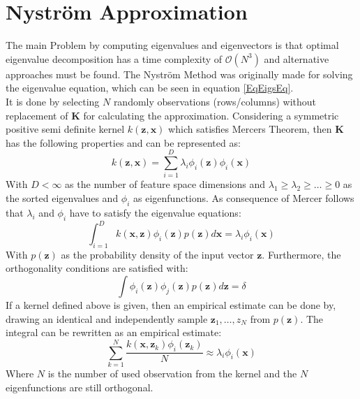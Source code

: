 \section{Nyström Approximation}\label{InSecNysMeth}
The main Problem by computing eigenvalues and eigenvectors is that optimal eigenvalue decomposition has a time complexity of $\mathcal{O}(N^3)$ and alternative approaches must be found.
The Nyström Method was originally made for solving the eigenvalue equation, which can be seen in equation \eqref{EqEigsEq}.\cite{Zhang.2008}\\
It is done by selecting $N$ randomly observations (rows/columns) without replacement of $\mathbf{K}$ for calculating the approximation.\cite{Williams.2000}
Considering a symmetric positive semi definite kernel $k(\mathbf{z},\mathbf{x})$ which satisfies Mercers Theorem, then $\mathbf{K}$ has the following properties and can be represented as:\cite{Williams.2000}
\begin{equation}\label{EqKernelRep}
	k(\mathbf{z},\mathbf{x}) = \sum_{i=1}^{D}\lambda_i\phi_i(\mathbf{z})\phi_i(\mathbf{x}) 
\end{equation}
With $D < \infty$ as the number of feature space dimensions and $\lambda_1 \ge \lambda_2\ge\dots\ge0$ as the sorted eigenvalues and $\phi_i$ as eigenfunctions.
As consequence of Mercer follows that  $\lambda_i$ and $\phi_i$ have to satisfy the eigenvalue equations:
 \begin{equation}\label{EqEigsEq}
	\int_{i=1}^{D} k(\mathbf{x},\mathbf{z})\phi_i(\mathbf{z})p(\mathbf{z})d\mathbf{x} = \lambda_i\phi_i(\mathbf{x})
\end{equation}
With $p(\mathbf{z})$ as the probability density of the input vector $\mathbf{z}$.
Furthermore, the orthogonality conditions are satisfied with:\cite[p. 59]{Scholkopf.2001}
\begin{equation}\label{EqEigsOrt}
	\int \phi_i(\mathbf{z})\phi_j(\mathbf{z})p(\mathbf{z})d\mathbf{z} = \delta
\end{equation}
If a kernel defined above is given, then an empirical estimate can be done by, drawing an identical and independently sample ${\mathbf{z}_1,\dots,z_N}$ from $p(\mathbf{z})$.
The integral can be rewritten as an empirical estimate:\cite{Williams.2000}
\begin{equation}\label{EqEigsEmp}
	\sum_{k=1}^{N}\frac{k(\mathbf{x},\mathbf{z}_k)\phi_i(\mathbf{z}_k)}{N} \approx \lambda_i\phi_i(\mathbf{x})
\end{equation}
Where $N$ is the number of used observation from the kernel and the $N$ eigenfunctions are still orthogonal.
